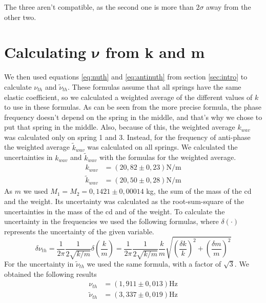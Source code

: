 \documentclass{article}
\begin{document}
The three aren't compatible, as the second one is more than $2 \sigma$ away from the other two. 

\section{Calculating $\bm \nu$ from k and m} \label{sec:nukm}

We then used equations \ref{eq:nuth} and \ref{eq:antinuth} from section \ref{sec:intro} to calculate $\nu_{th}$
and $\tilde \nu_{th}$. These formulas assume that all springs have
the same elastic coefficient, so we calculated a weighted average of
the different values of $k$ to use in these formulas. As can be seen from the more precise formula, the phase
frequency doesn't depend on the spring in the middle, and that's why we chose to put that spring in the middle. Also, because of this, the weighted average $k_{wav}$ was calculated only on spring 1 and 3.
Instead, for the frequency of anti-phase the weighted average 
$\tilde k_{wav}$ was calculated on all springs. We calculated the uncertainties in $k_{wav}$ and $\tilde k_{wav}$ with the formulas for the weighted average. 
\begin{align}
           k_{wav} &= (20,82 \pm 0,23) \text{N/m} \\
    \tilde k_{wav} &= (20,50 \pm 0,28) \text{N/m}
\end{align}
As $m$ we used $M_1=M_2=0,1421 \pm 0,00014$ kg, the sum of the mass of the cd and the weight. Its uncertainty was calculated as the root-sum-square of the uncertainties in the mass of the cd and of the weight.
To calculate the uncertainty in the frequencies we used the following formulas, where $\delta(\cdot)$ represents the uncertainty of the given variable.
\begin{equation} \label{eq:inc_nuth}
    \delta \nu_{th}
    = \frac{1}{2\pi} \frac{1}{2\sqrt{k/m}} \delta \left ( \frac{k}{m} \right )
    = \frac{1}{2\pi} \frac{1}{2\sqrt{k/m}}  \frac{k}{m} \sqrt{ \left ( \frac{ \delta k}{k}  \right ) ^2 +
           \left ( \frac{ \delta m}{m}  \right ) ^2}
\end{equation}
For the uncertainty in $\tilde \nu_{th}$ we used the same formula, with a factor of $\sqrt 3$. We obtained the following results
\begin{align}
           \nu_{th} &= (1,911 \pm 0,013) \text{Hz}\\
    \tilde \nu_{th} &= (3,337 \pm 0,019) \text{Hz}
\end{align}
\end{document}
